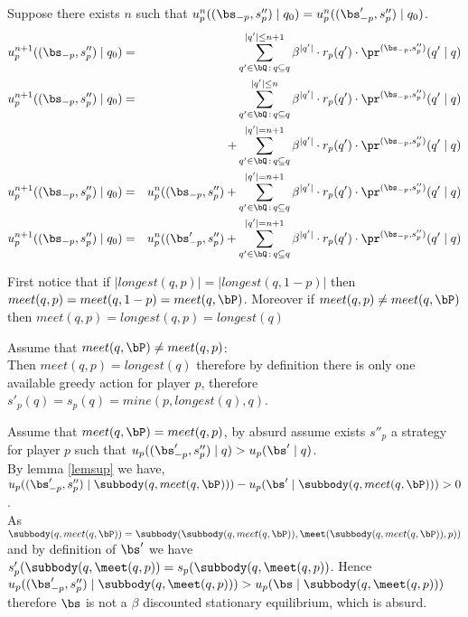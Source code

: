 	

\iffalse
Suppose there exists $n$ such that $u_p^n( (\bs_{-p},s''_p) \mid q_0) = u_p^n( (\bs'_{-p},s''_p) \mid q_0)$. 
\begin{eqnarray*}
	u_p^{n+1}( (\bs_{-p},s''_p) \mid q_0) & = & \sum_{q' \in \bQ \,:\, q \subseteq q}^{|q'| \leq n+1} \beta^{|q'|} \cdot  r_p(q') \cdot \pr^{(\bs_{-p},s''_p)}(q' \mid q) \\ 
	u_p^{n+1}( (\bs_{-p},s''_p) \mid q_0) & = & \sum_{q' \in \bQ \,:\, q \subseteq q}^{|q'| \leq n } \beta^{|q'|} \cdot  r_p(q') \cdot \pr^{(\bs_{-p},s''_p)}(q' \mid q) \\
	&& +   \sum_{q' \in \bQ \,:\, q \subseteq q}^{|q'| = n+1 } \beta^{|q'|} \cdot  r_p(q') \cdot \pr^{(\bs_{-p},s''_p)}(q' \mid q) \\
	u_p^{n+1}( (\bs_{-p},s''_p) \mid q_0) & = & u_p^{n}( (\bs_{-p},s''_p) +   \sum_{q' \in \bQ \,:\, q \subseteq q}^{|q'| = n+1 } \beta^{|q'|} \cdot  r_p(q') \cdot \pr^{(\bs_{-p},s''_p)}(q' \mid q) \\
	u_p^{n+1}( (\bs_{-p},s''_p) \mid q_0) & = & u_p^{n}( (\bs'_{-p},s''_p) +   \sum_{q' \in \bQ \,:\, q \subseteq q}^{|q'| = n+1 } \beta^{|q'|} \cdot  r_p(q') \cdot \pr^{(\bs_{-p},s''_p)}(q' \mid q) \\
\end{eqnarray*}

First notice that if $|longest(q,p)| = |longest(q,1-p)|$ then $meet(q,p) = meet(q,1-p) = meet(q,\bP)$. Moreover if $meet(q,p) \neq meet(q,\bP)$ then $meet(q,p) = longest(q,p) = longest(q)$

Assume that $meet(q,\bP) \neq meet(q,p)$:
\\Then $meet(q,p) = longest(q)$ therefore by definition there is only one available greedy action for player $p$, therefore $s'_p(q) = s_p(q) = mine(p,longest(q),q)$. 

Assume that $meet(q,\bP) = meet(q,p)$,
by absurd assume exists $s''_p$ a strategy for player $p$ such that $u_p ((\bs'_{-p},s''_p) \mid q) > u_p(\bs' \mid q)$.
\\By lemma \ref{lemsup} we have, $u_p((\bs'_{-p},s''_p) \mid \subbody(q,meet(q,\bP))) - u_p(\bs' \mid \subbody(q,meet(q,\bP))) > 0$. 
\\As $\subbody(q,meet(q,\bP)) = \subbody(\subbody(q,meet(q,\bP)),\meet(\subbody(q,meet(q,\bP)),p))$ and by definition of $\bs'$ we have $s'_p(\subbody(q,\meet(q,p)) = s_p(\subbody(q,\meet(q,p))$. Hence $u_p((\bs'_{-p},s''_p) \mid \subbody(q,\meet(q,p))) > u_p(\bs \mid \subbody(q,\meet(q,p)))$ therefore $\bs$ is not a $\beta$ discounted stationary equilibrium, which is absurd.

